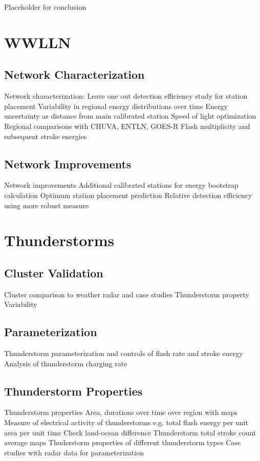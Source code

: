 Placeholder for conclusion

\section{WWLLN}

\subsection{Network Characterization}

Network characterization:
  Leave one out detection efficiency study for station placement
  Variability in regional energy distributions over time
  Energy uncertainty as distance from main calibrated station
  Speed of light optimization
  Regional comparisons with CHUVA, ENTLN, GOES-R
  Flash multiplicity and subsequent stroke energies
\subsection{Network Improvements}

Network improvements
  Additional calibrated stations for energy bootstrap calculation
  Optimum station placement prediction
  Relative detection efficiency using more robust measure

\section{Thunderstorms}

\subsection{Cluster Validation}

Cluster comparison to weather radar and case studies
  Thunderstorm property Variability

\subsection{Parameterization}

  Thunderstorm parameterization and controls of flash rate and stroke energy
  Analysis of thunderstorm charging rate

\subsection{Thunderstorm Properties}

 Thunderstorm properties
  Area, durations over time over region with maps
  Measure of electrical activity of thunderstorms
     e.g. total flash energy per unit area per unit time
     Check land-ocean difference
  Thunderstorm total stroke count average maps
  Thuderstorm properties of different thunderstorm types
  Case studies with radar data for parameterization

